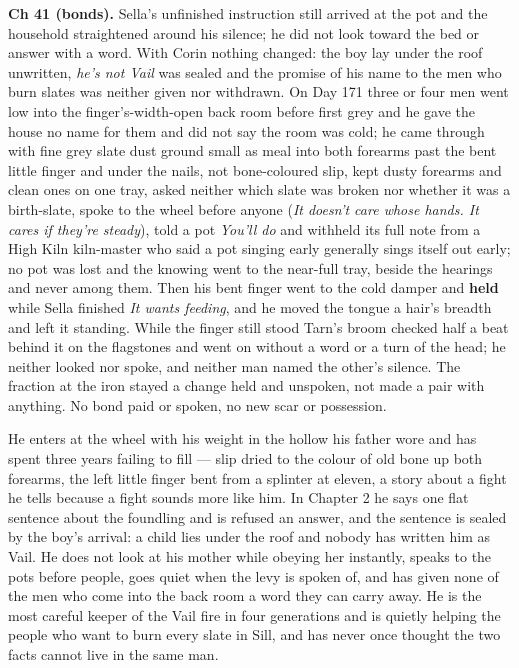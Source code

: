 \documentclass{design/chronicle}
\begin{document}
{\textbf{Ch 41 (bonds).} Sella’s unfinished instruction still arrived at the pot and the household straightened around his silence; he did not look toward the bed or answer with a word. With Corin nothing changed: the boy lay under the roof unwritten, \emph{he’s not Vail} was sealed and the promise of his name to the men who burn slates was neither given nor withdrawn. On Day 171 three or four men went low into the finger’s-width-open back room before first grey and he gave the house no name for them and did not say the room was cold; he came through with fine grey slate dust ground small as meal into both forearms past the bent little finger and under the nails, not bone-coloured slip, kept dusty forearms and clean ones on one tray, asked neither which slate was broken nor whether it was a birth-slate, spoke to the wheel before anyone (\emph{It doesn’t care whose hands. It cares if they’re steady}), told a pot \emph{You’ll do} and withheld its full note from a High Kiln kiln-master who said a pot singing early generally sings itself out early; no pot was lost and the knowing went to the near-full tray, beside the hearings and never among them. Then his bent finger went to the cold damper and \textbf{held} while Sella finished \emph{It wants feeding}, and he moved the tongue a hair’s breadth and left it standing. While the finger still stood Tarn’s broom checked half a beat behind it on the flagstones and went on without a word or a turn of the head; he neither looked nor spoke, and neither man named the other’s silence. The fraction at the iron stayed a change held and unspoken, not made a pair with anything. No bond paid or spoken, no new scar or possession.

He enters at the wheel with his weight in the hollow his father wore and has spent three years failing to fill --- slip dried to the colour of old bone up both forearms, the left little finger bent from a splinter at eleven, a story about a fight he tells because a fight sounds more like him. In Chapter 2 he says one flat sentence about the foundling and is refused an answer, and the sentence is sealed by the boy’s arrival: a child lies under the roof and nobody has written him as Vail. He does not look at his mother while obeying her instantly, speaks to the pots before people, goes quiet when the levy is spoken of, and has given none of the men who come into the back room a word they can carry away. He is the most careful keeper of the Vail fire in four generations and is quietly helping the people who want to burn every slate in Sill, and has never once thought the two facts cannot live in the same man.

}
\end{document}
